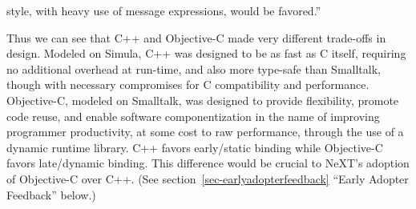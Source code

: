 \documentclass[acmsmall]{acmart}\settopmatter{}
\begin{document}
style, with heavy use of message expressions, would be favored.'' \citep[60]{cox_message/object_1984}

Thus we can see that C++ and Objective-C made very different trade-offs in design. Modeled on Simula, C++ was designed to be as fast as C itself, requiring no additional overhead at run-time, and also more type-safe than Smalltalk, though with necessary compromises for C compatibility and performance. Objective-C, modeled on Smalltalk, was designed to provide flexibility, promote code reuse, and enable software componentization in the name of improving programmer productivity, at some cost to raw performance, through the use of a dynamic runtime library. C++ favors early/static binding while Objective-C favors late/dynamic binding. This difference would be crucial to NeXT's adoption of Objective-C over C++. (See section~\ref{sec-earlyadopterfeedback} ``Early Adopter Feedback'' below.)
\end{document}
